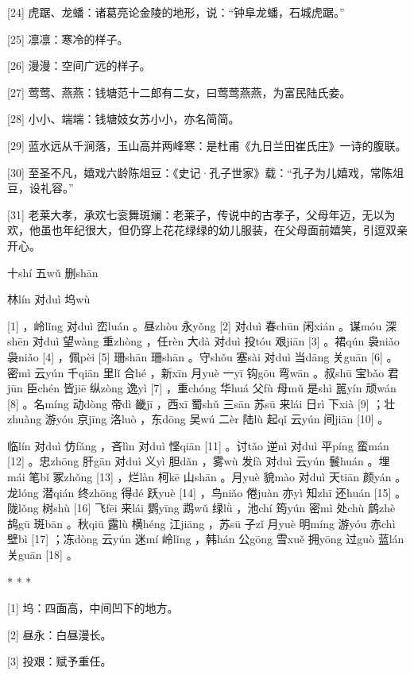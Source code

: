 \documentclass[12pt,UTF8]{ctexbook}
\begin{document}
[24] 虎踞、龙蟠：诸葛亮论金陵的地形，说：“钟阜龙蟠，石城虎踞。”

[25] 凛凛：寒冷的样子。

[26] 漫漫：空间广远的样子。

[27] 莺莺、燕燕：钱塘范十二郎有二女，曰莺莺燕燕，为富民陆氏妾。

[28] 小小、端端：钱塘妓女苏小小，亦名简简。

[29] 蓝水远从千涧落，玉山高并两峰寒：是杜甫《九日兰田崔氏庄》一诗的腹联。

[30] 至圣不凡，嬉戏六龄陈俎豆：《史记·孔子世家》载：“孔子为儿嬉戏，常陈俎豆，设礼容。”

[31] 老莱大孝，承欢七衮舞斑斓：老莱子，传说中的古孝子，父母年迈，无以为欢，他虽也年纪很大，但仍穿上花花绿绿的幼儿服装，在父母面前嬉笑，引逗双亲开心。





十shí 五wǔ 删shān


林lín 对duì 坞wù





[1] ，岭lǐng 对duì 峦luán 。昼zhòu 永yǒng [2] 对duì 春chūn 闲xián 。谋móu 深shēn 对duì 望wàng 重zhòng ，任rèn 大dà 对duì 投tóu 艰jiān [3] 。裙qún 袅niǎo 袅niǎo [4] ，佩pèi [5] 珊shān 珊shān 。守shǒu 塞sài 对duì 当dāng 关guān [6] 。密mì 云yún 千qiān 里lǐ 合hé ，新xīn 月yuè 一yī 钩gōu 弯wān 。叔shū 宝bǎo 君jūn 臣chén 皆jiē 纵zòng 逸yì [7] ，重chóng 华huá 父fù 母mǔ 是shì 嚚yín 顽wán [8] 。名míng 动dòng 帝dì 畿jī ，西xī 蜀shǔ 三sān 苏sū 来lái 日rì 下xià [9] ；壮zhuàng 游yóu 京jīng 洛luò ，东dōng 吴wú 二èr 陆lù 起qǐ 云yún 间jiān [10] 。

临lín 对duì 仿fǎng ，吝lìn 对duì 悭qiān [11] 。讨tǎo 逆nì 对duì 平píng 蛮mán [12] 。忠zhōng 肝gān 对duì 义yì 胆dǎn ，雾wù 发fà 对duì 云yún 鬟huán 。埋mái 笔bǐ 冢zhǒng [13] ，烂làn 柯kē 山shān 。月yuè 貌mào 对duì 天tiān 颜yán 。龙lóng 潜qián 终zhōng 得dé 跃yuè [14] ，鸟niǎo 倦juàn 亦yì 知zhī 还huán [15] 。陇lǒng 树shù [16] 飞fēi 来lái 鹦yīng 鹉wǔ 绿lǜ ，池chí 筠yún 密mì 处chù 鹧zhè 鸪gū 斑bān 。秋qiū 露lù 横héng 江jiāng ，苏sū 子zǐ 月yuè 明míng 游yóu 赤chì 壁bì [17] ；冻dòng 云yún 迷mí 岭lǐng ，韩hán 公gōng 雪xuě 拥yōng 过guò 蓝lán 关guān [18] 。



* * *



[1] 坞：四面高，中间凹下的地方。

[2] 昼永：白昼漫长。

[3] 投艰：赋予重任。
\end{document}
